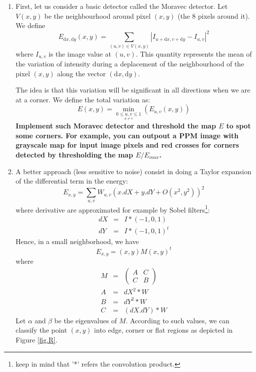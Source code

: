 \documentclass[a4paper, 11pt, french]{article}
\begin{document}
\begin{enumerate}
 	\item First, let us consider a basic detector called the Moravec detector. Let  $V(x,y)$ be the neighbourhood around pixel $(x,y)$ (the 8 pixels around it). We define 
	\begin{equation}
	\label{eq1}
	E_{\mathrm{d}x,\mathrm{d}y}(x,y)=\sum_{(u,v)\in V(x,y)} \left|I_{u+\mathrm{d}x,v+\mathrm{d}y}-I_{u,v}\right|^2
	\end{equation}
	where $I_{u,v}$ is the image value at $(u,v)$. This quantity represents the mean of the variation of intensity during a deplacement of the neighbourhood of the pixel $(x,y)$ along the vector $(\mathrm{d}x,\mathrm{d}y)$.
	
 	The idea is that this variation will be significant in all directions when we are at a corner. We define the total variation as:
 	\begin{equation}
	\label{eq1b}
	E(x,y)=\min\limits_{\underset{u\neq v}{0\leq u,v\leq 1}}(E_{u,v}(x,y))
	\end{equation}
	{\bf Implement such Moravec detector and threshold the map $E$ to spot some corners. For example, you can outpout a PPM image with grayscale map  for input image pixels and red crosses for corners detected by thresholding the map $E/E_{max}$.}

	\item A better approach (less sensitive to noise) consist in doing a Taylor expansion of the differential term in the energy:
	\begin{equation}
		E_{x,y}=\sum_{u,v} W_{u,v}\left(x.dX+y.dY+O(x^2,y^2)\right)^2
	\end{equation}
	where derivative are approximated for example by Sobel filters\footnote{keep in mind that '*' refers the convolution product.}:
	\begin{eqnarray}
		dX & = & I * (-1,0,1) \\
		dY & = & I * (-1,0,1)^t
	\end{eqnarray}  
	Hence, in a  small neighborhood, we have 
	$$E_{x,y}=(x,y) M (x,y)^t$$ where
	\begin{eqnarray}
		M & = &\left(\begin{array}{cc} A & C\\ C & B\end{array}\right)\\
		A & = & dX^2 *  W \\
		B & = & dY^2 * W \\
		C & = & (dX.dY)*  W 
	\end{eqnarray}
	Let $\alpha$ and $\beta$ be the eigenvalues of $M$. According to such values, we can classify the point $(x,y)$ into edge, corner or flat regions as depicted in Figure \ref{fig.R}.


\end{enumerate}
\end{document}
